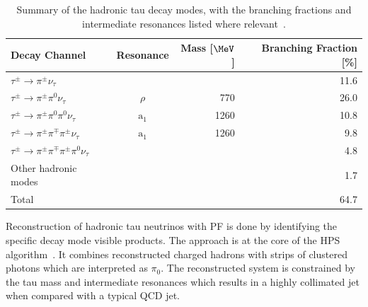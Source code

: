 \begin{table}[!htb]
\begin{tabular}{|l|c|r|r|}
\hline
Decay Channel & Resonance & Mass [$\MeV$] & Branching Fraction [\%] \\
\hline\hline
$\tau^{\pm} \rightarrow \pi^{\pm} \nu_\tau$                              &                &      & 11.6 \\
$\tau^{\pm} \rightarrow \pi^{\pm} \pi^{0}   \nu_\tau$                    & $\rho$         &  770 & 26.0 \\
$\tau^{\pm} \rightarrow \pi^{\pm} \pi^{0}   \pi^{0}   \nu_\tau$          & $\text{a}_{1}$ & 1260 & 10.8 \\
$\tau^{\pm} \rightarrow \pi^{\pm} \pi^{\mp} \pi^{\pm} \nu_\tau$          & $\text{a}_{1}$ & 1260 &  9.8 \\
$\tau^{\pm} \rightarrow \pi^{\pm} \pi^{\mp} \pi^{\pm} \pi^{0} \nu_\tau$  &                &      &  4.8 \\
\hline
Other hadronic modes                                                     &                &      &  1.7 \\
\hline\hline
Total & &  & 64.7 \\
\hline
\end{tabular}
\caption[Summary of the hadronic tau decay modes.]{Summary of the hadronic tau decay modes, with the branching fractions and intermediate resonances listed where relevant~\cite{ARTICLE:PDG}.}
\label{TABLE:EventReconstructionAndSimulation_TauDecays}
\end{table}

Reconstruction of hadronic tau neutrinos with \gls{PF} is done by identifying the specific decay mode visible products. The approach is at the core of the \gls{HPS} algorithm~\cite{ARTICLE:CMSPerformaceOfTauLeptonReconstruction,ARTICLE:CMSReconstructionIndentificationTau}. It combines reconstructed charged hadrons with strips of clustered photons which are interpreted as $\pi_0$. The reconstructed system is constrained by the tau mass and intermediate resonances which results in a highly collimated jet when compared with a typical \gls{QCD} jet.

